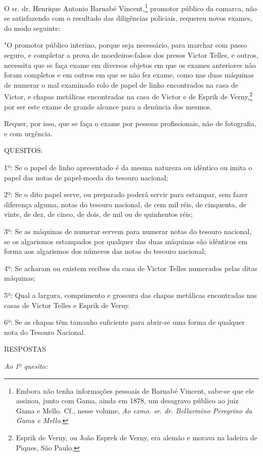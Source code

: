 O sr. dr. Henrique Antonio Barnabé Vincent,\footnote{Embora não tenha
  informações pessoais de Barnabé Vincent, sabe-se que ele assinou,
  junto com Gama, ainda em 1878, um desagravo público ao juiz Gama e
  Mello. Cf., nesse volume, \emph{Ao exmo. sr. dr. Bellarmino Peregrino
  da Gama e Mello}.} promotor público da comarca, não se satisfazendo
com o resultado das diligências policiais, requereu novos exames, do
modo seguinte:

"O promotor público interino, porque seja necessário, para marchar com
passo seguro, e completar a prova de moedeiros-falsos dos presos Victor
Telles, e outros, necessita que se faça exame em diversos objetos em que
os exames anteriores não foram completos e em outros em que se não fez
exame, como nas duas máquinas de numerar o mal examinado rolo de papel
de linho encontrados na casa de Victor, e chapas metálicas encontradas
na casa de Victor e de Esprik de Verny,\footnote{Esprik de Verny, ou
  João Esprek de Verny, era alemão e morava na ladeira de Piques, São
  Paulo.} por ser este exame de grande alcance para a denúncia dos
mesmos.

Requer, por isso, que se faça o exame por pessoas profissionais, não de
fotografia, e com urgência.

QUESITOS:

1º: Se o papel de linho apresentado é da mesma natureza ou idêntico ou
imita o papel das notas de papel-moeda do tesouro nacional;

2º: Se o dito papel serve, ou preparado poderá servir para estampar, sem
fazer diferença alguma, notas do tesouro nacional, de cem mil réis, de
cinquenta, de vinte, de dez, de cinco, de dois, de mil ou de quinhentos
réis;

3º: Se as máquinas de numerar servem para numerar notas do tesouro
nacional, se os algarismos estampados por qualquer das duas máquinas são
idênticos em forma aos algarismos dos números das notas do tesouro
nacional;

4º: Se acharam ou existem recibos da casa de Victor Telles numerados
pelas ditas máquinas;

5º: Qual a largura, comprimento e grossura das chapas metálicas
encontradas nas casas de Victor Telles e Esprik de Verny.

6º: Se as chapas têm tamanho suficiente para abrir-se uma forma de
qualquer nota do Tesouro Nacional.

RESPOSTAS

\emph{Ao 1}º \emph{quesito:}

